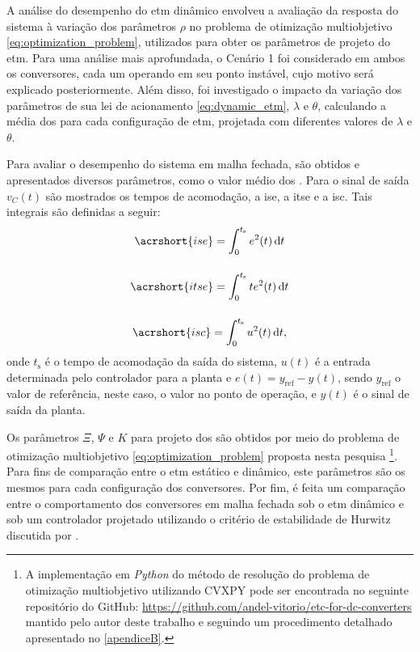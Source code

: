 A análise do desempenho do \acrshort{etm} dinâmico envolveu a avaliação da resposta do sistema à variação dos parâmetros $\rho$ no problema de otimização multiobjetivo \eqref{eq:optimization_problem}, utilizados para obter os parâmetros de projeto do \acrshort{etm}. Para uma análise mais aprofundada, o Cenário 1 foi considerado em ambos os conversores, cada um operando em seu ponto instável, cujo motivo será explicado posteriormente. Além disso, foi investigado o impacto da variação dos parâmetros de sua lei de acionamento \eqref{eq:dynamic_etm}, $\lambda$ e $\theta$, calculando a média dos  para cada configuração de \acrshort{etm}, projetada com diferentes valores de $\lambda$ e $\theta$.

Para avaliar o desempenho do sistema em malha fechada, são obtidos e apresentados diversos parâmetros, como o valor médio dos . Para o sinal de saída  $v_C(t)$ são mostrados os tempos de acomodação, a \acrfull{ise}, a \acrfull{itse} e a \acrfull{isc}. Tais integrais são definidas a seguir: \begin{gather}
  \acrshort{ise} = \int_0^{t_\mathrm{s}} e^2(t) \, \mathrm{d}t \\[12pt]
  \acrshort{itse} = \int_0^{t_\mathrm{s}} t e^2(t) \, \mathrm{d}t \\[12pt]
  \acrshort{isc} = \int_0^{t_\mathrm{s}} u^2(t) \, \mathrm{d}t,
\end{gather} onde $t_{\mathrm{s}}$ é o tempo de acomodação da saída do sistema, $u(t)$ é a entrada determinada pelo controlador para a planta e $e(t) = y_{\mathrm{ref}} - y(t)$, sendo $y_{\mathrm{ref}}$ o valor de referência, neste caso, o valor no ponto de operação, e $y(t)$ é o sinal de saída da planta.

Os parâmetros $\Xi$, $\Psi$ e $K$ para projeto dos  são obtidos por meio do problema de otimização multiobjetivo \eqref{eq:optimization_problem} proposta nesta pesquisa \footnote{A implementação em \textit{Python} do método de resolução do problema de otimização multiobjetivo utilizando CVXPY pode ser encontrada no seguinte repositório do GitHub: \url{https://github.com/andel-vitorio/etc-for-dc-converters} mantido pelo autor deste trabalho e seguindo um procedimento detalhado apresentado no \autoref{apendiceB}.}. Para fins de comparação entre o \acrshort{etm} estático e dinâmico, este parâmetros são os mesmos para cada configuração dos conversores. Por fim, é feita um comparação entre o comportamento dos conversores em malha fechada sob o \acrshort{etm} dinâmico e sob um controlador projetado utilizando o critério de estabilidade de Hurwitz discutida por \cite{Duan2013}.

